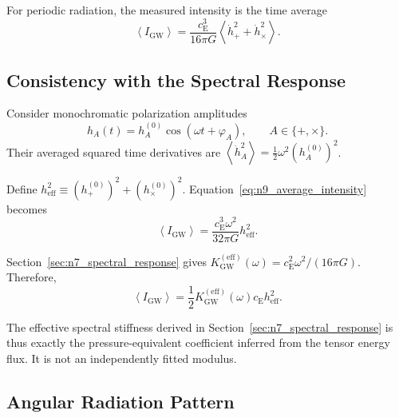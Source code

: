 For periodic radiation, the measured intensity is the time average
\begin{equation}
    \left\langle I_{\mathrm{GW}} \right\rangle = \frac{ c_{\mathrm{E}}^{3} }{ 16\pi G } \left\langle \dot{h}_{+}^{2} + \dot{h}_{\times}^{2} \right\rangle.
    \label{eq:n9_average_intensity}
\end{equation}

\subsection{Consistency with the Spectral Response}
\label{subsec:n9_spectral_flux_consistency}

Consider monochromatic polarization amplitudes
\begin{equation}
    h_{A}(t) = h_{A}^{(0)} \cos \left( \omega t+\varphi_{A} \right), \qquad A\in\{+,\times\}.
\end{equation}
Their averaged squared time derivatives are $\left\langle \dot{h}_{A}^{2} \right\rangle = \frac{1}{2}\omega^{2} \left( h_{A}^{(0)} \right)^{2}$.

Define $h_{\mathrm{eff}}^{2} \equiv \left( h_{+}^{(0)} \right)^{2} + \left( h_{\times}^{(0)} \right)^{2}$. Equation~\eqref{eq:n9_average_intensity} becomes
\begin{equation}
    \left\langle I_{\mathrm{GW}} \right\rangle = \frac{ c_{\mathrm{E}}^{3}\omega^{2} }{ 32\pi G } h_{\mathrm{eff}}^{2}.
    \label{eq:n9_monochromatic_flux}
\end{equation}

Section~\ref{sec:n7_spectral_response} gives $K_{\mathrm{GW}}^{(\mathrm{eff})}(\omega) = c_{\mathrm{E}}^{2}\omega^{2} / (16\pi G)$. Therefore,
\begin{equation}
    \left\langle I_{\mathrm{GW}} \right\rangle = \frac{1}{2} K_{\mathrm{GW}}^{(\mathrm{eff})}(\omega) c_{\mathrm{E}} h_{\mathrm{eff}}^{2}.
    \label{eq:n9_spectral_flux_relation}
\end{equation}

The effective spectral stiffness derived in Section~\ref{sec:n7_spectral_response} is thus exactly the pressure-equivalent coefficient inferred from the tensor energy flux. It is not an independently fitted modulus.

\subsection{Angular Radiation Pattern}
\label{subsec:n9_angular_radiation_pattern}

